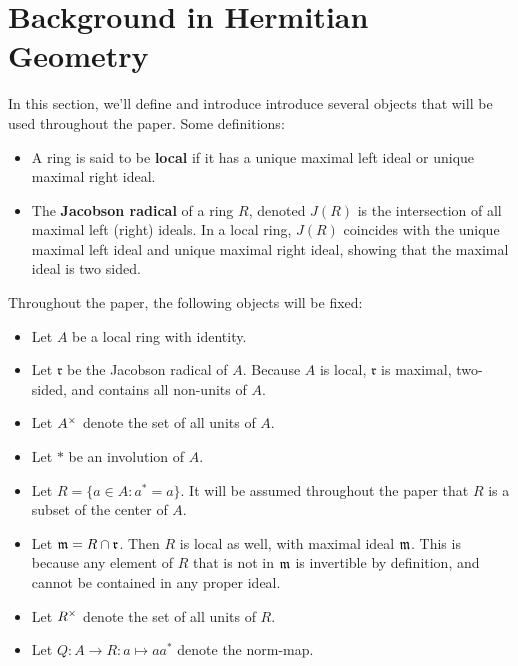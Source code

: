 \section{Background in Hermitian Geometry}

In this section, we'll define and introduce introduce several objects that will be used throughout the paper.
Some definitions:

\begin{itemize}
\item A ring is said to be \textbf{local} if it has a unique maximal left ideal or unique maximal right ideal.
\item The \textbf{Jacobson radical} of a ring $R$, denoted $J(R)$ is the intersection of all maximal left (right) ideals.
In a local ring, $J(R)$ coincides with the unique maximal left ideal and unique maximal right ideal, showing that the maximal ideal is two sided.
\end{itemize}
Throughout the paper, the following objects will be fixed:
\begin{itemize}
\item Let $A$ be a local ring with identity.

\item Let $\mathfrak{r}$ be the Jacobson radical of $A$. Because $A$ is local, $\mathfrak{r}$ is maximal, two-sided, and contains all non-units of $A$.

\item Let $A^\times$ denote the set of all units of $A$.

\item Let $*$ be an involution of $A$. 

\item Let $R = \{a \in A: a^* = a\}$. It will be assumed throughout the paper that $R$ is a subset of the center of $A$.

\item Let $\mathfrak{m} = R \cap \mathfrak{r}$.
Then $R$ is local as well, with maximal ideal $\mathfrak{m}$.
This is because any element of $R$ that is not in $\mathfrak{m}$ is invertible by definition, and cannot be contained in any proper ideal.

\item Let $R^\times$ denote the set of all units of $R$.

\item Let $Q: A \to R: a \mapsto aa^*$ denote the norm-map.
\end{itemize}

